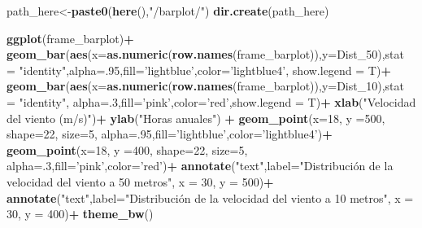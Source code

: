 \documentclass[]{article}
\newenvironment{Shaded}{\begin{snugshade}}{\end{snugshade}}
\newcommand{\KeywordTok}[1]{\textcolor[rgb]{0.13,0.29,0.53}{\textbf{#1}}}
\newcommand{\DataTypeTok}[1]{\textcolor[rgb]{0.13,0.29,0.53}{#1}}
\newcommand{\DecValTok}[1]{\textcolor[rgb]{0.00,0.00,0.81}{#1}}
\newcommand{\StringTok}[1]{\textcolor[rgb]{0.31,0.60,0.02}{#1}}
\newcommand{\OperatorTok}[1]{\textcolor[rgb]{0.81,0.36,0.00}{\textbf{#1}}}
\newcommand{\NormalTok}[1]{#1}
\begin{document}
\begin{Shaded}
\begin{Highlighting}[]
{{{\NormalTok{path_here<-}\KeywordTok{paste0}\NormalTok{(}\KeywordTok{here}\NormalTok{(),}\StringTok{"/barplot/"}\NormalTok{)   }
\KeywordTok{dir.create}\NormalTok{(path_here)}

\KeywordTok{ggplot}\NormalTok{(frame_barplot)}\OperatorTok{+}
\StringTok{  }\KeywordTok{geom_bar}\NormalTok{(}\KeywordTok{aes}\NormalTok{(}\DataTypeTok{x=}\KeywordTok{as.numeric}\NormalTok{(}\KeywordTok{row.names}\NormalTok{(frame_barplot)),}\DataTypeTok{y=}\NormalTok{Dist_}\DecValTok{50}\NormalTok{),}\DataTypeTok{stat =} \StringTok{"identity"}\NormalTok{,}\DataTypeTok{alpha=}\NormalTok{.}\DecValTok{95}\NormalTok{,}\DataTypeTok{fill=}\StringTok{'lightblue'}\NormalTok{,}\DataTypeTok{color=}\StringTok{'lightblue4'}\NormalTok{, }\DataTypeTok{show.legend =}\NormalTok{ T)}\OperatorTok{+}
\StringTok{  }\KeywordTok{geom_bar}\NormalTok{(}\KeywordTok{aes}\NormalTok{(}\DataTypeTok{x=}\KeywordTok{as.numeric}\NormalTok{(}\KeywordTok{row.names}\NormalTok{(frame_barplot)),}\DataTypeTok{y=}\NormalTok{Dist_}\DecValTok{10}\NormalTok{),}\DataTypeTok{stat =} \StringTok{"identity"}\NormalTok{, }\DataTypeTok{alpha=}\NormalTok{.}\DecValTok{3}\NormalTok{,}\DataTypeTok{fill=}\StringTok{'pink'}\NormalTok{,}\DataTypeTok{color=}\StringTok{'red'}\NormalTok{,}\DataTypeTok{show.legend =}\NormalTok{ T)}\OperatorTok{+}
\StringTok{  }\KeywordTok{xlab}\NormalTok{(}\StringTok{"Velocidad del viento (m/s)"}\NormalTok{)}\OperatorTok{+}
\StringTok{  }\KeywordTok{ylab}\NormalTok{(}\StringTok{"Horas anuales"}\NormalTok{) }\OperatorTok{+}
\StringTok{  }\KeywordTok{geom_point}\NormalTok{(}\DataTypeTok{x=}\DecValTok{18}\NormalTok{, }\DataTypeTok{y =}\DecValTok{500}\NormalTok{, }\DataTypeTok{shape=}\DecValTok{22}\NormalTok{, }\DataTypeTok{size=}\DecValTok{5}\NormalTok{, }\DataTypeTok{alpha=}\NormalTok{.}\DecValTok{95}\NormalTok{,}\DataTypeTok{fill=}\StringTok{'lightblue'}\NormalTok{,}\DataTypeTok{color=}\StringTok{'lightblue4'}\NormalTok{)}\OperatorTok{+}
\StringTok{  }\KeywordTok{geom_point}\NormalTok{(}\DataTypeTok{x=}\DecValTok{18}\NormalTok{, }\DataTypeTok{y =}\DecValTok{400}\NormalTok{, }\DataTypeTok{shape=}\DecValTok{22}\NormalTok{, }\DataTypeTok{size=}\DecValTok{5}\NormalTok{, }\DataTypeTok{alpha=}\NormalTok{.}\DecValTok{3}\NormalTok{,}\DataTypeTok{fill=}\StringTok{'pink'}\NormalTok{,}\DataTypeTok{color=}\StringTok{'red'}\NormalTok{)}\OperatorTok{+}
\StringTok{  }\KeywordTok{annotate}\NormalTok{(}\StringTok{"text"}\NormalTok{,}\DataTypeTok{label=}\StringTok{"Distribución de la velocidad del viento a 50 metros"}\NormalTok{, }\DataTypeTok{x =} \DecValTok{30}\NormalTok{, }\DataTypeTok{y =} \DecValTok{500}\NormalTok{)}\OperatorTok{+}
\StringTok{  }\KeywordTok{annotate}\NormalTok{(}\StringTok{"text"}\NormalTok{,}\DataTypeTok{label=}\StringTok{"Distribución de la velocidad del viento a 10 metros"}\NormalTok{, }\DataTypeTok{x =} \DecValTok{30}\NormalTok{, }\DataTypeTok{y =} \DecValTok{400}\NormalTok{)}\OperatorTok{+}
\StringTok{  }\KeywordTok{theme_bw}\NormalTok{()}

}}}
\end{Highlighting}
\end{Shaded}
\end{document}
